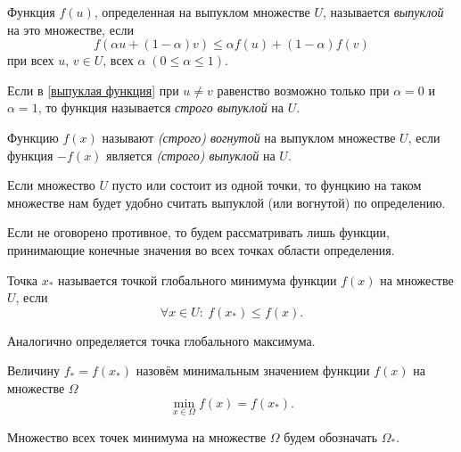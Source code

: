 
\begin{definition}
	Функция $f(u)$, определенная на выпуклом множестве $U$, называется \textit{выпуклой} на это множестве, если
	\begin{equation}\label{выпуклая функция}
		f(\alpha u + (1-\alpha)v)\leq\alpha f(u) + (1-\alpha)f(v)
	\end{equation}
	при всех $u,\,v\in U$, всех $\alpha\; (0\leq\alpha\leq1)$. 
\end{definition}

\begin{definition}
	Если в \eqref{выпуклая функция} при $u\neq v$ равенство возможно только при $\alpha=0$ и $\alpha=1$, то функция называется \textit{строго выпуклой} на $U$.
\end{definition}

\begin{definition}
	Функцию $f(x)$ называют \textit{(строго) вогнутой} на выпуклом множестве $U$, если функция $-f(x)$ является \textit{(строго) выпуклой} на $U$.
\end{definition}

\begin{remark}
	Если множество $U$ пусто или состоит из одной точки, то фунцкию на таком множестве нам будет удобно считать выпуклой (или вогнутой) по определению.
\end{remark}

\begin{remark}
	Если не оговорено противное, то будем рассматривать лишь функции, принимающие конечные значения во всех точках области определения.
\end{remark}

\begin{definition}
	Точка $x_*$ называется точкой глобального минимума функции $f(x)$ на множестве $U$, если 
	\begin{equation*}
		\forall x \in U:\: f(x_*) \leq f(x).
	\end{equation*}
\end{definition}

Аналогично определяется точка глобального максимума.

\begin{definition}
	Величину $f_* = f(x_*)$ назовём минимальным значением функции $f(x)$ на множестве $\Omega$
	\begin{equation*}
		\min_{x\in \Omega} f(x) = f(x_*).
	\end{equation*}
\end{definition}
\begin{remark}
	Множество всех точек минимума на множестве $\Omega$ будем обозначать $\Omega_*$.
\end{remark}


